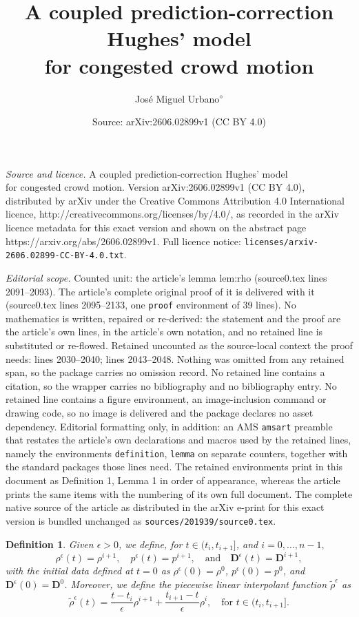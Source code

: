 \documentclass[10pt,a4paper]{amsart}
\title{A coupled prediction-correction Hughes' model\\ for congested crowd motion}
\author{Jos\'{e} Miguel Urbano$^{\diamond}$}
\date{Source: arXiv:2606.02899v1 (CC BY 4.0)}
\newtheorem{definition}{Definition}
\newcommand{\de}{\mathbf{D}}
\begin{document}
\maketitle

\noindent\emph{Source and licence.} A coupled prediction-correction Hughes' model\\ for congested crowd motion. Version arXiv:2606.02899v1 (CC BY 4.0), distributed by arXiv under the Creative Commons Attribution 4.0 International licence, http://creativecommons.org/licenses/by/4.0/, as recorded in the arXiv licence metadata for this exact version and shown on the abstract page https://arxiv.org/abs/2606.02899v1. Full licence notice: \texttt{licenses/arxiv-2606.02899-CC-BY-4.0.txt}.\par\smallskip

\noindent\textit{Editorial scope.} Counted unit: the article's lemma lem:rho (source0.tex lines 2091--2093). The article's complete original proof of it is delivered with it (source0.tex lines 2095--2133, one \texttt{proof} environment of 39 lines). No mathematics is written, repaired or re-derived: the statement and the proof are the article's own lines, in the article's own notation, and no retained line is substituted or re-flowed.  Retained uncounted as the source-local context the proof needs: lines 2030--2040; lines 2043--2048.  Nothing was omitted from any retained span, so the package carries no omission record.  No retained line contains a citation, so the wrapper carries no bibliography and no bibliography entry.  No retained line contains a figure environment, an image-inclusion command or drawing code, so no image is delivered and the package declares no asset dependency.  Editorial formatting only, in addition: an AMS \texttt{amsart} preamble that restates the article's own declarations and macros used by the retained lines, namely the environments \texttt{definition}, \texttt{lemma} on separate counters, together with the standard packages those lines need.  The retained environments print in this document as Definition 1, Lemma 1 in order of appearance, whereas the article prints the same items with the numbering of its own full document.  The complete native source of the article as distributed in the arXiv e-print for this exact version is bundled unchanged as \texttt{sources/201939/source0.tex}.
\begin{definition}\label{def:interpolants}
Given $\epsilon >0$, we define, for $t \in (t_i, t_{i+1}]$, and $i = 0, \dots, n-1,$
\begin{equation}\label{eq:approx-sol}
	    \rho^\epsilon(t) = \rho^{i+1}, \quad p^\epsilon(t) = p^{i+1}, \quad \text{and} \quad \de^\epsilon(t) = \de^{i+1},
\end{equation}
with the initial data defined at $t=0$ as $\rho^\epsilon(0) = \rho^0$, $p^\epsilon(0) = p^0$, and $\de^\epsilon(0) = \de^0$. 
Moreover, we define the piecewise linear interpolant function $\tilde{\rho}^\epsilon$ as
\begin{equation}\label{eq:tilde-rho}
    \tilde{\rho}^\epsilon(t) = \frac{t - t_i}{\epsilon}\rho^{i+1} + \frac{t_{i+1} - t}{\epsilon}\rho^{i}, \quad \text{for } t \in (t_i, t_{i+1}].
\end{equation}
\end{definition}
\end{document}
